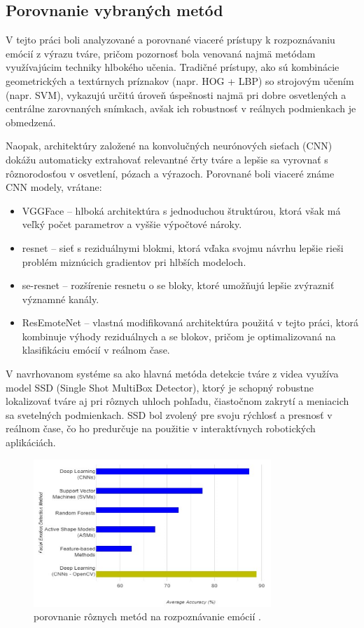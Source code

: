 \subsection{Porovnanie vybraných metód}
V tejto práci boli analyzované a porovnané viaceré prístupy k rozpoznávaniu emócií z výrazu tváre, pričom pozornosť bola venovaná najmä metódam využívajúcim techniky hlbokého učenia. Tradičné prístupy, ako sú kombinácie geometrických a textúrnych príznakov (napr. HOG + LBP) so strojovým učením (napr. SVM), vykazujú určitú úroveň úspešnosti najmä pri dobre osvetlených a centrálne zarovnaných snímkach, avšak ich robustnosť v reálnych podmienkach je obmedzená.

Naopak, architektúry založené na konvolučných neurónových sieťach (CNN) dokážu automaticky extrahovať relevantné črty tváre a lepšie sa vyrovnať s rôznorodosťou v osvetlení, pózach a výrazoch. Porovnané boli viaceré známe CNN modely, vrátane:
\begin{itemize}
    \item VGGFace – hlboká architektúra s jednoduchou štruktúrou, ktorá však má veľký počet parametrov a vyššie výpočtové nároky.
    \item \gls{resnet} – sieť s reziduálnymi blokmi, ktorá vďaka svojmu návrhu lepšie rieši problém miznúcich gradientov pri hlbších modeloch.
    \item \gls{se}-\gls{resnet} – rozšírenie \gls{resnet}u o \gls{se} bloky, ktoré umožňujú lepšie zvýrazniť významné kanály.
    \item ResEmoteNet – vlastná modifikovaná architektúra použitá v tejto práci, ktorá kombinuje výhody reziduálnych a \gls{se} blokov, pričom je optimalizovaná na klasifikáciu emócií v reálnom čase.
\end{itemize}

V navrhovanom systéme sa ako hlavná metóda detekcie tváre z videa využíva model SSD (Single Shot MultiBox Detector), ktorý je schopný robustne lokalizovať tváre aj pri rôznych uhloch pohľadu, čiastočnom zakrytí a meniacich sa svetelných podmienkach. SSD bol zvolený pre svoju rýchlosť a presnosť v reálnom čase, čo ho predurčuje na použitie v interaktívnych robotických aplikáciách.

\begin{figure}[!htpb]
    \centering
    \includegraphics[width=0.8\textwidth]{img/comparation.png}
    \caption{porovnanie rôznych metód na rozpoznávanie emócií \cite{inProceedings02}.}
    \label{fig:comparation}
\end{figure}
\newpage
